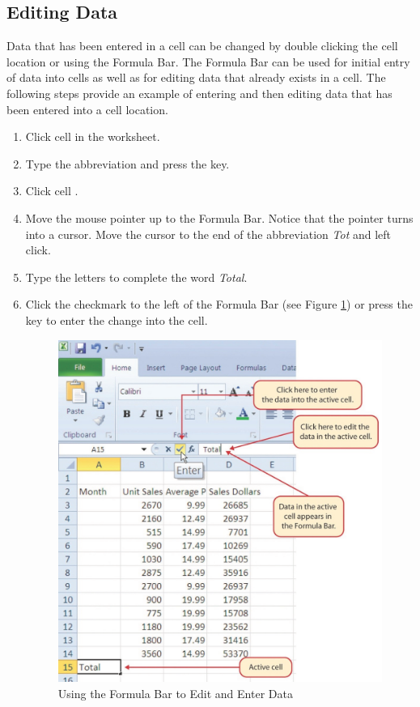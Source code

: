 \subsection{Editing Data}

Data that has been entered in a cell can be changed by double clicking the cell location or using the Formula Bar. The Formula Bar can be used for initial entry of data into cells as well as for editing data that already exists in a cell. The following steps provide an example of entering and then editing data that has been entered into a cell location.

\begin{enumbox}
	\begin{enumerate}
		\item Click cell  in the  worksheet.
		\item Type the abbreviation  and press the  key.
		\item Click cell .
		\item Move the mouse pointer up to the Formula Bar. Notice that the pointer turns into a cursor. Move the cursor to the end of the abbreviation \textit{Tot} and left click.
		\item Type the letters  to complete the word \textit{Total}.
		\item Click the checkmark to the left of the Formula Bar (see Figure \ref{01:fig17}) or press the  key to enter the change into the cell.
	
		\begin{figure}[H]
			\centering
			\includegraphics[width=\maxwidth{.95\linewidth}]{gfx/ch01_fig17}
			\caption{Using the Formula Bar to Edit and Enter Data}
			\label{01:fig17}
		\end{figure}


\end{enumerate}
\end{enumbox}
